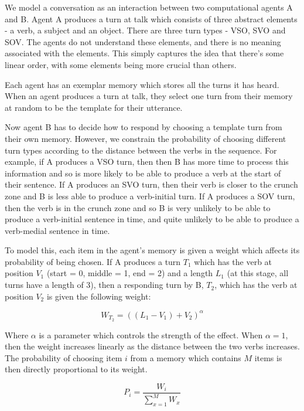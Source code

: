 \documentclass[12pt]{article}
\begin{document}
We model a conversation as an interaction between two computational agents A and B.  Agent A produces a turn at talk which consists of  three abstract elements - a verb, a subject and an object.  There are three turn types - VSO, SVO and SOV.  The agents do not understand these elements, and there is no meaning associated with the elements.  This simply captures the idea that there's some linear order, with some elements being more crucial than others.

Each agent has an exemplar memory which stores all the turns it has heard.  When an agent produces a turn at talk, they select one turn from their memory at random to be the template for their utterance.  

Now agent B has to decide how to respond by choosing a template turn from their own memory.  However, we constrain the probability of choosing different turn types according to the distance between the verbs in the sequence.  For example, if A produces a VSO turn, then then B has more time to process this information and so is more likely to be able to produce a verb at the start of their sentence.  If A produces an SVO turn, then their verb is closer to the crunch zone and B is less able to produce a verb-initial turn.  If A produces a SOV turn, then the verb is in the crunch zone and so B is very unlikely to be able to produce a verb-initial sentence in time, and quite unlikely to be able to produce a verb-medial sentence in time.

To model this, each item in the agent's memory is given a weight which affects its probability of being chosen.  If A produces a turn $T_1$ which has the verb at position $V_1$ (start = 0, middle = 1, end = 2) and a length $L_1$ (at this stage, all turns have a length of 3), then a responding turn by B, $T_2$, which has the verb at position $V_2$ is given the following weight:

\begin{equation}
W_{T_2} = ((L_1 - V_1) + V_2) ^ \alpha
\end{equation}

Where $\alpha$ is a parameter which controls the strength of the effect.  When $\alpha = 1$, then the weight increases linearly as the distance between the two verbs increases.  The probability of choosing item $i$ from a memory which contains $M$ items is then directly proportional to its weight.

\begin{equation}
P_i = \frac{W_i}{\sum_{x=1}^{M} W_x}
\end{equation}
\end{document}
